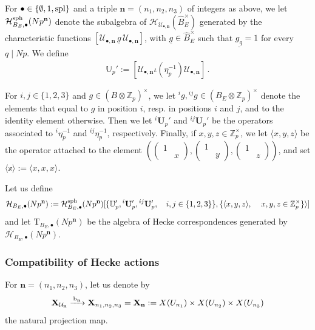 \documentclass{amsart}
\numberwithin{equation}{section}
\newcommand{\ZZ}{\mathbb{Z}}
\begin{document}
For $\bullet \in \{\emptyset,  1, {\rm spl}\}$ and a triple $\mathbf{n}=(n_1,n_2,n_3)$ of integers as above, we let $\mathcal{H}_{B_E,\bullet}^{\rm sph}(Np^{\mathbf{n}})$ denote the subalgebra of $\mathcal{H}_{\mathcal{U}_{\bullet,\mathbf{n}}}( \widehat{B}_E^\times)$ generated by the characteristic functions $[\mathcal{U}_{\bullet,\mathbf{n}}\, \underline{g}\, \mathcal{U}_{\bullet,\mathbf{n}}]$, with $\underline{g}\in \widehat{B}_E^\times$ such that $\underline{g_q} = 1$ for every $q \mid Np$. We define
\begin{align*}
 \mathbb{U}_p' := [\mathcal{U}_{\bullet,\mathbf{n}} \iota( \eta_p^{-1}) \mathcal{U}_{\bullet,\mathbf{n}}]\,.
\end{align*}

\noindent For $i,j \in \{1,2,3\}$ and $g \in (B \otimes \ZZ_p)^\times$, we let $^{i}g, {}^{ij}g \in (B_E \otimes \ZZ_p)^\times$ denote the elements that equal to $g$ in position $i$, resp. in positions $i$ and $j$, and to the identity element otherwise. Then we let $^{i}\mathbf{U}_p'$ and $^{ij}\mathbf{U}_p'$ be the operators associated to $^{i}\eta_p^{-1}$ and $^{ij}\eta_p^{-1}$, respectively. Finally, if $x,y,z \in \ZZ_p^\times$, we let $\langle x, y, z \rangle$ be the operator attached to the element $\left(\left( \begin{smallmatrix}
    1 & \\ & x
\end{smallmatrix}\right),\left( \begin{smallmatrix}
    1 & \\ & y
\end{smallmatrix}\right),\left( \begin{smallmatrix}
    1 & \\ & z
\end{smallmatrix}\right)\right)$, and set $\langle \mathbb{x} \rangle := \langle x, x,x \rangle$.

Let us define
$$\mathcal{H}_{B_E,\bullet}(Np^{\mathbf{n}}) : = \mathcal{H}_{B_E,\bullet}^{\rm sph}(Np^{\mathbf{n}}) [\{  \mathbb{U}_p',{}^{i}\mathbf{U}_p',{}^{ij}\mathbf{U}_p', \quad  i,j \in \{ 1,2,3 \}\}, \{ \langle x,y,z \rangle, \quad \, x,y,z \in \ZZ_p^\times \}\rangle]$$
 and let $\mathrm{T}_{B_E,\bullet}(Np^{\mathbf{n}})$ be the algebra of Hecke correspondences generated by $\mathcal{H}_{B_E,\bullet}(Np^{\mathbf{n}})$. 


 \subsubsection{Compatibility of Hecke actions} 
 \label{subsubsec_2025_10_15_1335}
 For $\mathbf{n}=(n_1,n_2,n_3)$, let us denote by 
 $$\mathbf{X}_{\mathcal{U}_{\mathbf{n}}}  \xrightarrow{\,{\rm b}_{\mathbf{n}}\,} \mathbf{X}_{n_1,n_2,n_3} = \mathbf{X}_{\mathbf{n}} :=X({U_{n_1}}) \times X({U_{n_2}}) \times X({U_{n_3}})$$ 
 the natural projection map. 
\end{document}
